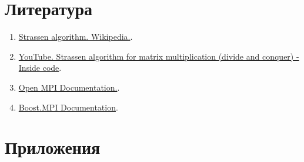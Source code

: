 \documentclass[a4paper,12pt]{article}
\begin{document}
\section{Литература}
\begin{enumerate}
    \item \href{https://en.wikipedia.org/wiki/Strassen_algorithm}{Strassen algorithm. Wikipedia.}.
    \item \href{https://www.youtube.com/watch?v=OSelhO6Qnlc&ab_channel=Insidecode}{YouTube. Strassen algorithm for matrix multiplication (divide and conquer) - Inside code}.
    \item \href{https://www.open-mpi.org/doc/}{Open MPI Documentation.}.
    \item \href{https://www.boost.org/doc/libs/release/doc/html/mpi.html}{Boost.MPI Documentation}.
\end{enumerate}

\section{Приложения}
\end{document}
